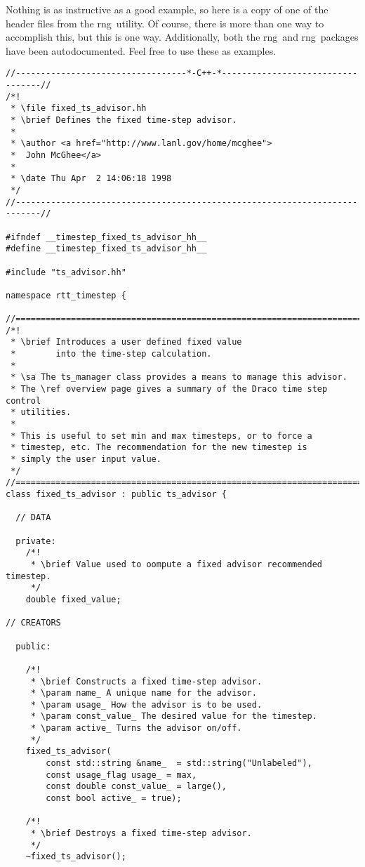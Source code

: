 \documentclass[11pt]{nmemo}
\newcommand{\rng}{{\normalfont\sffamily rng}}
\newcommand{\timestep}{{\normalfont\sffamily rng}}
\begin{document}
Nothing is as instructive as a good example, so here is a copy of
one of the header files from the \timestep\ utility. Of course,
there is more than one way to accomplish this, but this is one way.
Additionally, both the \rng\ and \timestep\ packages have been
autodocumented.  Feel free to use these as examples.

\begin{verbatim}
//----------------------------------*-C++-*----------------------------------//
/*! 
 * \file fixed_ts_advisor.hh
 * \brief Defines the fixed time-step advisor.
 *
 * \author <a href="http://www.lanl.gov/home/mcghee">
 *  John McGhee</a>
 *
 * \date Thu Apr  2 14:06:18 1998
 */
//---------------------------------------------------------------------------//

#ifndef __timestep_fixed_ts_advisor_hh__
#define __timestep_fixed_ts_advisor_hh__

#include "ts_advisor.hh"

namespace rtt_timestep {

//===========================================================================//
/*!
 * \brief Introduces a user defined fixed value 
 *        into the time-step calculation.
 *
 * \sa The ts_manager class provides a means to manage this advisor.
 * The \ref overview page gives a summary of the Draco time step control
 * utilities. 
 *
 * This is useful to set min and max timesteps, or to force a
 * timestep, etc. The recommendation for the new timestep is
 * simply the user input value. 
 */ 
//===========================================================================//
class fixed_ts_advisor : public ts_advisor {

  // DATA

  private:
    /*!
     * \brief Value used to oompute a fixed advisor recommended timestep.
     */
    double fixed_value; 
   
// CREATORS

  public:

    /*!
     * \brief Constructs a fixed time-step advisor.
     * \param name_ A unique name for the advisor.
     * \param usage_ How the advisor is to be used.
     * \param const_value_ The desired value for the timestep.
     * \param active_ Turns the advisor on/off.
     */
    fixed_ts_advisor( 
        const std::string &name_  = std::string("Unlabeled"),
        const usage_flag usage_ = max, 
        const double const_value_ = large(),
        const bool active_ = true);

    /*!
     * \brief Destroys a fixed time-step advisor.
     */
    ~fixed_ts_advisor();


\end{verbatim}
\end{document}
